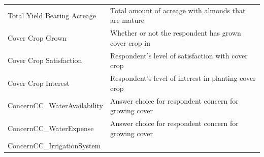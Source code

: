 \documentclass[12pt,]{article}
\begin{document}
\begin{longtable}[]{@{}ll@{}}
\begin{minipage}[t]{0.59\columnwidth}
Total Yield Bearing Acreage\strut
\end{minipage} & \begin{minipage}[t]{0.18\columnwidth}\raggedright\strut
Total amount of acreage with almonds that are mature\strut
\end{minipage}\tabularnewline
\begin{minipage}[t]{0.59\columnwidth}\raggedright\strut
Cover Crop Grown\strut
\end{minipage} & \begin{minipage}[t]{0.18\columnwidth}\raggedright\strut
Whether or not the respondent has grown cover crop in\strut
\end{minipage}\tabularnewline
\begin{minipage}[t]{0.59\columnwidth}\raggedright\strut
Cover Crop Satisfaction\strut
\end{minipage} & \begin{minipage}[t]{0.18\columnwidth}\raggedright\strut
Respondent's level of satisfaction with cover crop\strut
\end{minipage}\tabularnewline
\begin{minipage}[t]{0.59\columnwidth}\raggedright\strut
Cover Crop Interest\strut
\end{minipage} & \begin{minipage}[t]{0.18\columnwidth}\raggedright\strut
Respondent's level of interest in planting cover crop\strut
\end{minipage}\tabularnewline
\begin{minipage}[t]{0.59\columnwidth}\raggedright\strut
ConcernCC\_WaterAvailability\strut
\end{minipage} & \begin{minipage}[t]{0.18\columnwidth}\raggedright\strut
Answer choice for respondent concern for growing cover\strut
\end{minipage}\tabularnewline
\begin{minipage}[t]{0.59\columnwidth}\raggedright\strut
ConcernCC\_WaterExpense\strut
\end{minipage} & \begin{minipage}[t]{0.18\columnwidth}\raggedright\strut
Answer choice for respondent concern for growing cover\strut
\end{minipage}\tabularnewline
\begin{minipage}[t]{0.59\columnwidth}\raggedright\strut
ConcernCC\_IrrigationSystem\strut
\end{minipage} & \begin{minipage}[t]{0.18\columnwidth}\raggedright\strut

\end{minipage}
\end{longtable}
\end{document}
